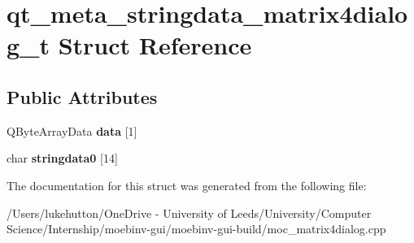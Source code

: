 \hypertarget{structqt__meta__stringdata__matrix4dialog__t}{}\section{qt\+\_\+meta\+\_\+stringdata\+\_\+matrix4dialog\+\_\+t Struct Reference}
\label{structqt__meta__stringdata__matrix4dialog__t}
\subsection*{Public Attributes}
\begin{DoxyCompactItemize}
\item 
\mbox{\label{structqt__meta__stringdata__matrix4dialog__t_a24c7d203a03bf49c7852e08c8583b12b}} 
Q\+Byte\+Array\+Data {\bfseries data} \mbox{[}1\mbox{]}
\item 
\mbox{\label{structqt__meta__stringdata__matrix4dialog__t_a5509d1e4a8dcb461cb64d3d4c6a0f14f}} 
char {\bfseries stringdata0} \mbox{[}14\mbox{]}
\end{DoxyCompactItemize}


The documentation for this struct was generated from the following file\+:\begin{DoxyCompactItemize}
\item 
/\+Users/lukehutton/\+One\+Drive -\/ University of Leeds/\+University/\+Computer Science/\+Internship/moebinv-\/gui/moebinv-\/gui-\/build/moc\+\_\+matrix4dialog.\+cpp\end{DoxyCompactItemize}

